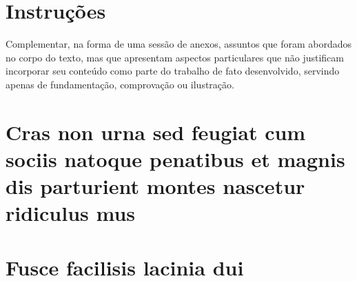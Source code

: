 \documentclass[
	12pt,			%
	openany,			%
	oneside,			%
	a4paper,			%
	english,			%
	french,				%
	spanish,			%
	brazil				%
	]{abntex2}
\begin{document}
\begin{anexosenv}

\partanexos

\chapter{Instruções}
Complementar, na forma de uma sessão de anexos, assuntos que foram abordados no
corpo do texto, mas que apresentam aspectos particulares que não justificam incorporar seu
conteúdo como parte do trabalho de fato desenvolvido, servindo apenas de fundamentação,
comprovação ou ilustração.

\chapter{Cras non urna sed feugiat cum sociis natoque penatibus et magnis dis
parturient montes nascetur ridiculus mus}

\lipsum[31]

\chapter{Fusce facilisis lacinia dui}

\lipsum[32]

\end{anexosenv}

\end{document}
